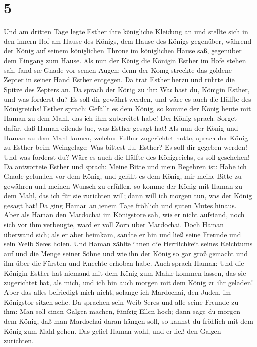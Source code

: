 \hypertarget{section-4}{%
\section{5}\label{section-4}}

 Und am dritten Tage legte Esther ihre königliche Kleidung
an und stellte sich in den innern Hof am Hause des Königs, dem Hause des
Königs gegenüber, während der König auf seinem königlichen Throne im
königlichen Hause saß, gegenüber dem Eingang zum Hause. 
Als nun der König die Königin Esther im Hofe stehen sah, fand sie Gnade
vor seinen Augen; denn der König streckte das goldene Zepter in seiner
Hand Esther entgegen. Da trat Esther herzu und rührte die Spitze des
Zepters an.  Da sprach der König zu ihr: Was hast du,
Königin Esther, und was forderst du? Es soll dir gewährt werden, und
wäre es auch die Hälfte des Königreichs!  Esther sprach:
Gefällt es dem König, so komme der König heute mit Haman zu dem Mahl,
das ich ihm zubereitet habe!  Der König sprach: Sorget
dafür, daß Haman eilends tue, was Esther gesagt hat! Als nun der König
und Haman zu dem Mahl kamen, welches Esther zugerichtet hatte,
 sprach der König zu Esther beim Weingelage: Was bittest
du, Esther? Es soll dir gegeben werden! Und was forderst du? Wäre es
auch die Hälfte des Königreichs, es soll geschehen!  Da
antwortete Esther und sprach: Meine Bitte und mein Begehren ist:
 Habe ich Gnade gefunden vor dem König, und gefällt es dem
König, mir meine Bitte zu gewähren und meinen Wunsch zu erfüllen, so
komme der König mit Haman zu dem Mahl, das ich für sie zurichten will;
dann will ich morgen tun, was der König gesagt hat!  Da
ging Haman an jenem Tage fröhlich und guten Mutes hinaus. Aber als Haman
den Mardochai im Königstore sah, wie er nicht aufstand, noch sich vor
ihm verbeugte, ward er voll Zorn über Mardochai.  Doch
Haman überwand sich; als er aber heimkam, sandte er hin und ließ seine
Freunde und sein Weib Seres holen.  Und Haman zählte
ihnen die Herrlichkeit seines Reichtums auf und die Menge seiner Söhne
und wie ihn der König so gar groß gemacht und ihn über die Fürsten und
Knechte erhoben habe.  Auch sprach Haman: Und die Königin
Esther hat niemand mit dem König zum Mahle kommen lassen, das sie
zugerichtet hat, als mich, und ich bin auch morgen mit dem König zu ihr
geladen!  Aber das alles befriedigt mich nicht, solange
ich Mardochai, den Juden, im Königstor sitzen sehe.  Da
sprachen sein Weib Seres und alle seine Freunde zu ihm: Man soll einen
Galgen machen, fünfzig Ellen hoch; dann sage du morgen dem König, daß
man Mardochai daran hängen soll, so kannst du fröhlich mit dem König zum
Mahl gehen. Das gefiel Haman wohl, und er ließ den Galgen zurichten.

